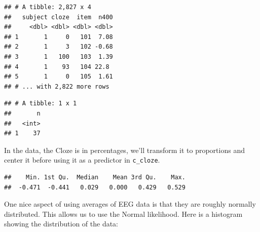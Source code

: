 \documentclass[12pt,]{krantz}
\newenvironment{Shaded}{\begin{snugshade}}{\end{snugshade}}
\newcommand{\KeywordTok}[1]{\textcolor[rgb]{0.13,0.29,0.53}{\textbf{#1}}}
\newcommand{\DataTypeTok}[1]{\textcolor[rgb]{0.13,0.29,0.53}{#1}}
\newcommand{\DecValTok}[1]{\textcolor[rgb]{0.00,0.00,0.81}{#1}}
\newcommand{\StringTok}[1]{\textcolor[rgb]{0.31,0.60,0.02}{#1}}
\newcommand{\CommentTok}[1]{\textcolor[rgb]{0.56,0.35,0.01}{\textit{#1}}}
\newcommand{\OperatorTok}[1]{\textcolor[rgb]{0.81,0.36,0.00}{\textbf{#1}}}
\newcommand{\NormalTok}[1]{#1}
\theoremstyle{definition}
\theoremstyle{definition}
\theoremstyle{definition}
\theoremstyle{remark}
\begin{document}
\begin{verbatim}
## # A tibble: 2,827 x 4
##   subject cloze  item  n400
##     <dbl> <dbl> <dbl> <dbl>
## 1       1     0   101  7.08
## 2       1     3   102 -0.68
## 3       1   100   103  1.39
## 4       1    93   104 22.8 
## 5       1     0   105  1.61
## # ... with 2,822 more rows
\end{verbatim}

\begin{Shaded}
\end{Shaded}

\begin{verbatim}
## # A tibble: 1 x 1
##       n
##   <int>
## 1    37
\end{verbatim}

In the data, the Cloze is in percentages, we'll transform it to
proportions and center it before using it as a predictor in
\texttt{c\_cloze}.

\begin{Shaded}
\end{Shaded}

\begin{verbatim}
##    Min. 1st Qu.  Median    Mean 3rd Qu.    Max. 
##  -0.471  -0.441   0.029   0.000   0.429   0.529
\end{verbatim}

One nice aspect of using averages of EEG data is that they are roughly
normally distributed. This allows us to use the Normal likelihood. Here
is a histogram showing the distribution of the data:
\end{document}
